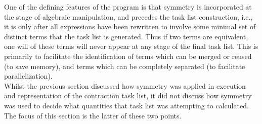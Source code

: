 \noindent One of the defining features of the program is that symmetry is
incorporated at the stage of algebraic manipulation, and precedes the task list
construction, i.e., it is only after all expressions have been rewritten to
involve some minimal set of distinct terms that the task list is generated.
Thus if two terms are equivalent, one will of these terms will never appear at
any stage of the final task list.  This is primarily to facilitate the
identification of terms which can be merged or reused (to save memory), and
terms which can be completely separated (to facilitate parallelization).\\

\noindent Whilst the previous section discussed how symmetry was applied in 
execution and representation of the contraction task list, it did not
discuss how symmetry was used to decide what quantities that task list was
attempting to calculated. The focus of this section is the latter of these 
two points.\\

